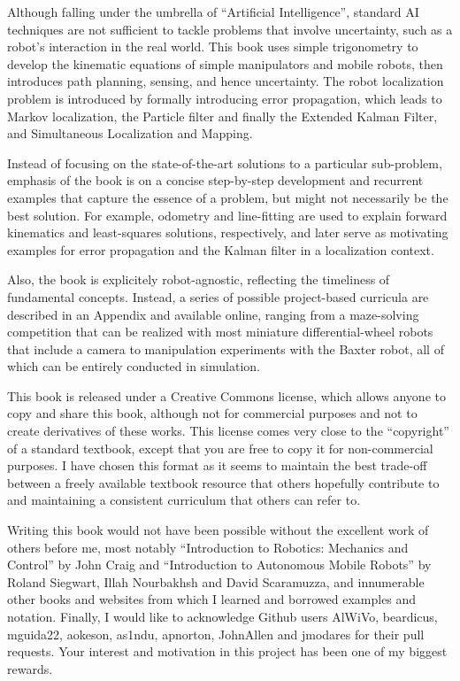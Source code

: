 \documentclass[paper=6.14in:9.21in,pagesize=pdftex,11pt,twoside,openright]{scrbook}
\begin{document}
Although falling under the umbrella of ``Artificial Intelligence'', standard AI techniques are not sufficient to tackle problems that involve uncertainty, such as a robot's interaction in the real world. This book uses simple trigonometry to develop the kinematic equations of simple manipulators and mobile robots, then introduces path planning, sensing, and hence uncertainty. The robot localization problem is introduced by formally introducing error propagation, which leads to Markov localization, the Particle filter and finally the Extended Kalman Filter, and Simultaneous Localization and Mapping.

Instead of focusing on the state-of-the-art solutions to a particular sub-problem, emphasis of the book is on a concise step-by-step development and recurrent examples that capture the essence of a problem, but might not necessarily be the best solution. For example, odometry and line-fitting are used to explain forward kinematics and least-squares solutions, respectively, and later serve as motivating examples for error propagation and the Kalman filter in a localization context.

Also, the book is explicitely robot-agnostic, reflecting the timeliness of fundamental concepts. Instead, a series of possible project-based curricula are described in an Appendix and available online, ranging from a maze-solving competition that can be realized with most miniature differential-wheel robots that include a camera to manipulation experiments with the Baxter robot, all of which can be entirely conducted in simulation.

This book is released under a Creative Commons license, which allows anyone to copy and share this book, although not for commercial purposes and not to create derivatives of these works. This license comes very close to the ``copyright'' of a standard textbook, except that you are free to copy it for non-commercial purposes. I have chosen this format as it seems to maintain the best trade-off between a freely available textbook resource that others hopefully contribute to and maintaining a consistent curriculum that others can refer to.

Writing this book would not have been possible without the excellent work of others before me, most notably ``Introduction to Robotics: Mechanics and Control'' by John Craig and ``Introduction to Autonomous Mobile Robots'' by Roland Siegwart, Illah Nourbakhsh and David Scaramuzza, and innumerable other books and websites from which I learned and borrowed examples and notation. Finally, I would like to acknowledge Github users AlWiVo, beardicus, mguida22, aokeson, as1ndu, apnorton, JohnAllen and jmodares for their pull requests. Your interest and motivation in this project has been one of my biggest rewards.
\end{document}
